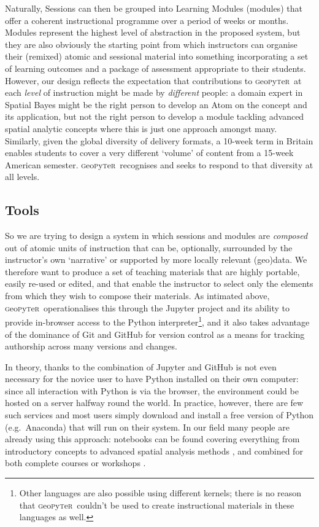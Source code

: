 \documentclass[letter, 11pt]{article}
\newcommand{\gp}{\textsc{g}eo\textsc{p}y\textsc{t}e\textsc{r}~\/}
\newcommand{\eg}{e.g.~\/}
\begin{document}
Naturally, Sessions can then be grouped into Learning Modules (modules) that
offer a coherent instructional programme over a period of weeks or months.
Modules represent the highest level of abstraction in the proposed system, but
they are also obviously the starting point from which instructors can organise
their (remixed) atomic and sessional material into something incorporating a set
of learning outcomes and a package of assessment appropriate to their students.
However, our design reflects the expectation that contributions to \gp at each
\emph{level} of instruction might be made by \emph{different} people: a domain
expert in Spatial Bayes might be the right person to develop an Atom on the
concept and its application, but not the right person to develop a module
tackling advanced spatial analytic concepts where this is just one approach
amongst many. Similarly, given the global diversity of delivery formats, a
10-week term in Britain enables students to cover a very different `volume' of
content from a 15-week American semester. \gp recognises and seeks to respond to
that diversity at all levels.

\subsection{Tools}\label{tools}

So we are trying to design a system in which sessions and modules are
\emph{composed} out of atomic units of instruction that can be, optionally,
surrounded by the instructor's own `narrative' or supported by more locally
relevant (geo)data. We therefore want to produce a set of teaching materials
that are highly portable, easily re-used or edited, and that enable the
instructor to select only the elements from which they wish to compose their
materials. As intimated above, \gp operationalises this through the Jupyter
project and its ability to provide in-browser access to the Python
interpreter\footnote{Other languages are also possible using different kernels;
there is no reason that \gp couldn't be used to create instructional materials
in these languages as well.}, and it also takes advantage of the dominance of
Git and GitHub for version control as a means for tracking authorship across
many versions and changes.

In theory, thanks to the combination of Jupyter and GitHub is not even necessary
for the novice user to have Python installed on their own computer: since all
interaction with Python is via the browser, the environment could be hosted on a
server halfway round the world. In practice, however, there are few such
services and most users simply download and install a free version of Python
(\eg Anaconda) that will run on their system. In our field many people are
already using this approach: notebooks can be found covering everything from
introductory concepts \citep{millington_reades_2017_code} to advanced spatial
analysis methods \citep{darribas_gds15}, and combined for both complete courses
or workshops \citep{rey_2016_narsc}.
\end{document}
